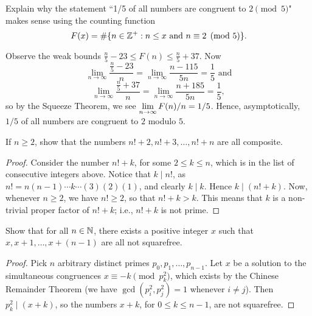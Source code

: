 \documentclass{article}
\begin{document}
\begin{exercise}[Chapter 13, \#1a]
Explain why the statement ``1/5 of all numbers are congruent to $2\pmod 5$" makes sense using the counting function
$$F(x) = \#\{n\in \mathbb Z^+: n\leq x \text{ and } n\equiv 2\pmod 5\}.$$
\begin{solution}
Observe the weak bounds $\frac n5 - 23 \leq F(n) \leq \frac n5 + 37$. Now
$$\lim_{n\to\infty} \frac{\frac n5 -23}n = \lim_{n\to \infty} \frac{n-115}{5n} = \frac 15 \text{ and}$$
$$\lim_{n\to\infty} \frac{\frac n5+37}n = \lim_{n\to\infty} \frac{n+185}{5n} = \frac 15,$$
so by the Squeeze Theorem, we see $\displaystyle\lim_{n\to\infty} F(n)/n = 1/5$. Hence, asymptotically, $1/5$ of all numbers are congruent to $2$ modulo $5$.
\end{solution}
\end{exercise}

\begin{exercise}[Chapter 13, \#3]
If $n\geq 2$, show that the numbers $n! + 2, n! + 3,\ldots, n! + n$ are all composite.
\end{exercise}
\begin{proof}
Consider the number $n! + k$, for some $2\leq k \leq n$, which is in the list of consecutive integers above. Notice that $k\mid n!$, as $n! = n(n-1)\cdots k \cdots (3)(2)(1)$, and clearly $k\mid k$. Hence $k\mid (n! + k)$. Now, whenever $n\geq 2$, we have $n!\geq 2$, so that $n! + k > k$. This means that $k$ is a non-trivial proper factor of $n! + k$; i.e., $n! + k$ is not prime.
\end{proof}

\begin{exercise}
Show that for all $n\in\mathbb N$, there exists a positive integer $x$ such that $x, x+1, \ldots, x+(n-1)$ are all not squarefree.
\end{exercise}
\begin{proof}
Pick $n$ arbitrary distinct primes $p_0,p_1,\ldots, p_{n-1}$. Let $x$ be a solution to the simultaneous congruences $x\equiv -k \pmod{p_k^2}$, which exists by the Chinese Remainder Theorem (we have $\gcd(p_i^2, p_j^2) = 1$ whenever $i\neq j$). Then $p_k^2 \mid (x+k)$, so the numbers $x+k$, for $0\leq k \leq n-1$, are not squarefree.
\end{proof}
\end{document}
